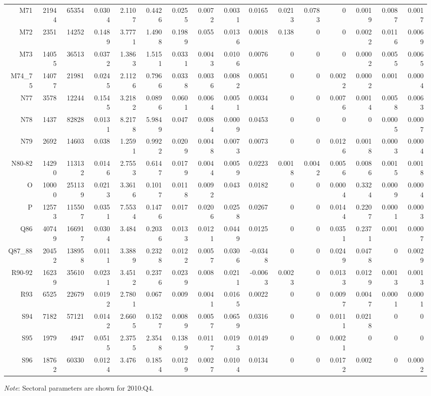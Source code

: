 \begin{table}[!htb]
{\begin{tabular}{rrrrrrrrrrrrrrrr}
M71 & 21944 & 65354 & 0.0304 & 2.1107 & 0.4426 & 0.0255 & 0.0072 & 0.0031 & 0.0165 & 0.0213 & 0.0783 & 0 & 0.0019 & 0.0087 & 0.0017 \\
M72 & 2351 & 14252 & 0.1489 & 3.7771 & 1.4908 & 0.1989 & 0.055 & 0.0136 & 0.0018 & 0.138 & 0 & 0 & 0.0022 & 0.0116 & 0.0069 \\
M73 & 14055 & 36513 & 0.0372 & 1.3863 & 1.5151 & 0.0331 & 0.0043 & 0.0106 & 0.0076 & 0 & 0 & 0 & 0.0002 & 0.0055 & 0.0065 \\
M74\_75 & 14077 & 21981 & 0.0245 & 2.1126 & 0.7966 & 0.0338 & 0.0036 & 0.0082 & 0.0051 & 0 & 0 & 0.0022 & 0.0002 & 0.001 & 0.0004 \\
N77 & 3578 & 12244 & 0.1545 & 3.2182 & 0.0896 & 0.0601 & 0.0064 & 0.0051 & 0.0034 & 0 & 0 & 0.0076 & 0.0014 & 0.0058 & 0.0063 \\
N78 & 1437 & 82828 & 0.0131 & 8.2178 & 5.9849 & 0.047 & 0.0084 & 0.0009 & 0.0453 & 0 & 0 & 0 & 0 & 0.0005 & 0.0007 \\
N79 & 2692 & 14603 & 0.038 & 1.2591 & 0.9922 & 0.0209 & 0.0048 & 0.0073 & 0.0073 & 0 & 0 & 0.0126 & 0.0018 & 0.0003 & 0.0004 \\
N80-82 & 14290 & 113132 & 0.0146 & 2.7553 & 0.6147 & 0.0179 & 0.0044 & 0.0059 & 0.0223 & 0.0018 & 0.0042 & 0.0056 & 0.0086 & 0.0015 & 0.0018 \\
O & 10000 & 251139 & 0.0213 & 3.3616 & 0.1017 & 0.0118 & 0.0092 & 0.043 & 0.0182 & 0 & 0 & 0.0004 & 0.3324 & 0.0009 & 0.0004 \\
P & 12573 & 115507 & 0.0351 & 7.5534 & 0.1476 & 0.017 & 0.0206 & 0.0258 & 0.0267 & 0 & 0 & 0.0144 & 0.2207 & 0.0001 & 0.0003 \\
Q86 & 40749 & 166917 & 0.0304 & 3.484 & 0.2036 & 0.0133 & 0.0121 & 0.0449 & 0.0125 & 0 & 0 & 0.0351 & 0.2371 & 0.001 & 0.0007 \\
Q87\_88 & 20452 & 138958 & 0.0111 & 3.3889 & 0.2328 & 0.0122 & 0.0057 & 0.0306 & -0.0348 & 0 & 0 & 0.0249 & 0.0478 & 0 & 0.0029 \\
R90-92 & 16239 & 35610 & 0.0231 & 3.4512 & 0.2376 & 0.0239 & 0.008 & 0.0211 & -0.0063 & 0.0023 & 0 & 0.0133 & 0.0129 & 0.0013 & 0.0013 \\
R93 & 6525 & 22679 & 0.0192 & 2.7801 & 0.067 & 0.009 & 0.0041 & 0.0165 & 0.0022 & 0 & 0 & 0.0097 & 0.0047 & 0.0001 & 0.0001 \\
S94 & 7182 & 57121 & 0.0142 & 2.6605 & 0.1527 & 0.0089 & 0.0057 & 0.0659 & 0.0316 & 0 & 0 & 0.0111 & 0.0218 & 0 & 0 \\
S95 & 1979 & 4947 & 0.0515 & 2.3755 & 2.3548 & 0.1389 & 0.0117 & 0.0193 & 0.0149 & 0 & 0 & 0.0021 & 0 & 0 & 0 \\
S96 & 18762 & 60330 & 0.0124 & 3.476 & 0.1854 & 0.0129 & 0.0027 & 0.0104 & 0.0134 & 0 & 0 & 0.0172 & 0.002 & 0 & 0.0002 \\
\bottomrule
\end{tabular}
}
\begin{tablenotes}
	\footnotesize \item \textit{Note}: Sectoral parameters are shown for 2010:Q4. 
\end{tablenotes}
\end{table}
